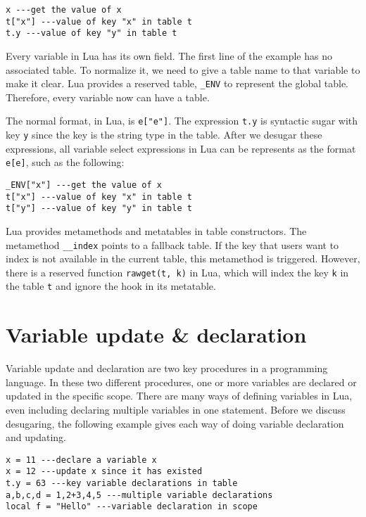 \begin{verbatim}
x ---get the value of x
t["x"] ---value of key "x" in table t
t.y ---value of key "y" in table t
\end{verbatim}

Every variable in Lua has its own field. 
The first line of the example has no associated table.
To normalize it, we need to give a table name to that variable to make it clear.
Lua provides a reserved table, {\tt \_ENV} to represent the global table. Therefore, every variable now can have a table.

The normal format, in Lua, is {\tt e["e"]}. 
The expression {\tt t.y} is syntactic sugar with key {\tt y} since the key is the string type in the table. After we desugar these expressions, all variable select expressions in Lua can be represents as the format {\tt e[e]}, such as the following:

\begin{verbatim}
_ENV["x"] ---get the value of x
t["x"] ---value of key "x" in table t
t["y"] ---value of key "y" in table t
\end{verbatim}

Lua provides metamethods and metatables in table constructors. The metamethod {\tt \_\_index} points to a fallback table. If the key that users want to index is not available in the current table, this metamethod is triggered. However, there is a reserved function {\tt rawget(t, k)} in Lua, which will index the key {\tt k} in the table {\tt t} and ignore the hook in its metatable.

\section{Variable update \& declaration}\label{sec:desugarVarUpdate}
Variable update and declaration are two key procedures in a programming language. 
In these two different procedures, one or more variables are declared or updated in the specific scope. There are many ways of defining variables in Lua, even including declaring multiple variables in one statement. Before we discuss desugaring, the following example gives each way of doing variable declaration and updating.

\begin{verbatim}
x = 11 ---declare a variable x
x = 12 ---update x since it has existed
t.y = 63 ---key variable declarations in table
a,b,c,d = 1,2+3,4,5 ---multiple variable declarations
local f = "Hello" ---variable declaration in scope
\end{verbatim}

